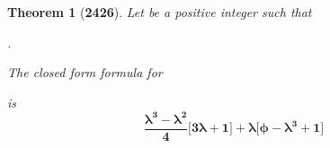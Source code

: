 \documentclass[preview]{standalone}
\newtheorem{theorem}{Theorem}
\begin{document}
\begin{theorem}[\textbf{2426}]
    \raggedright Let \bm{$\phi$} be a positive integer such that 
    \raggedright \bm{$\big \lfloor \sqrt[3] \phi \big \rfloor = \lambda$}.
    \raggedright The closed form formula for 
    \raggedright {} 
    is 
    \begin{equation*}
        \bm{
            \frac{
                \lambda ^3 - \lambda ^2
            }
            {4}
            \Bigg[ 3 \lambda + 1 \Bigg]
                + 
            \lambda
            \Bigg[
                \phi - \lambda ^3 + 1
            \Bigg]
        }
    \end{equation*}
\end{theorem}
\end{document}
